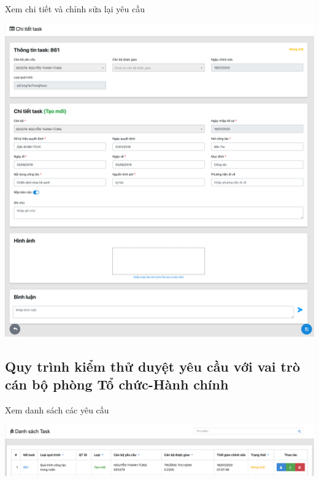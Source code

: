 \newpage
\noindent Xem chi tiết và chỉnh sửa lại yêu cầu
\begin{center}
  \captionsetup{type=figure}
  \includegraphics[width=15cm]{img/test/taskDetailUser.png}
\end{center}
\subsection{Quy trình kiểm thử duyệt yêu cầu với vai trò cán bộ phòng Tổ chức-Hành chính}
\noindent Xem danh sách các yêu cầu
\begin{center}
  \captionsetup{type=figure}
  \includegraphics[width=15cm]{img/test/adminTask.png}
\end{center}

